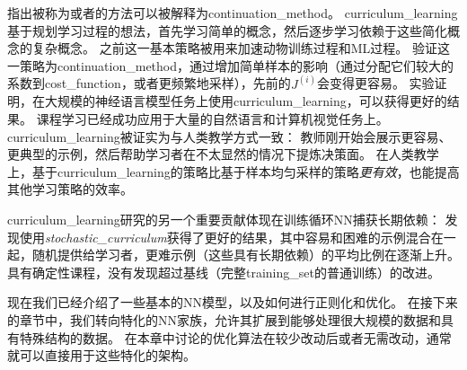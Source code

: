 \cite{Bengio-et-al-2009}指出被称为或者的方法可以被解释为\gls{continuation_method}。
\gls{curriculum_learning}基于规划学习过程的想法，首先学习简单的概念，然后逐步学习依赖于这些简化概念的复杂概念。
之前这一基本策略被用来加速动物训练过程\citep{Skinner-1958,Peterson-2004,Krueger-Dayan-2009}和\gls{ML}过程\citep{Solomonoff-1989,Elman-1993,Sanger-1994}。
\cite{Bengio-et-al-2009}验证这一策略为\gls{continuation_method}，通过增加简单样本的影响（通过分配它们较大的系数到\gls{cost_function}，或者更频繁地采样），先前的$J^{(i)}$会变得更容易。
实验证明，在大规模的神经语言模型任务上使用\gls{curriculum_learning}，可以获得更好的结果。
课程学习已经成功应用于大量的自然语言\citep{Spitkovsky-et-al-2010,Collobert-et-al-2011a,Mikolov-et-al-2011b,Tu-Honavar-2011}和计算机视觉\citep{Kumar-et-al-2010,Lee-Grauman-2011,Supancic-Ramanan-2013}任务上。
\gls{curriculum_learning}被证实为与人类教学方式一致\citep{Khan-et-al-2011}：
教师刚开始会展示更容易、更典型的示例，然后帮助学习者在不太显然的情况下提炼决策面。
在人类教学上，基于\gls{curriculum_learning}的策略比基于样本均匀采样的策略\emph{更有效}，也能提高其他学习策略的效率\citep{Basu-Christensen-2013}。


\gls{curriculum_learning}研究的另一个重要贡献体现在训练循环\gls{NN}捕获长期依赖：
\cite{Zaremba-Sutskever-2014}发现使用\emph{\gls{stochastic_curriculum}}获得了更好的结果，其中容易和困难的示例混合在一起，随机提供给学习者，更难示例（这些具有长期依赖）的平均比例在逐渐上升。
具有确定性课程，没有发现超过基线（完整\gls{training_set}的普通训练）的改进。

现在我们已经介绍了一些基本的\gls{NN}模型，以及如何进行正则化和优化。
在接下来的章节中，我们转向特化的\gls{NN}家族，允许其扩展到能够处理很大规模的数据和具有特殊结构的数据。
在本章中讨论的优化算法在较少改动后或者无需改动，通常就可以直接用于这些特化的架构。

